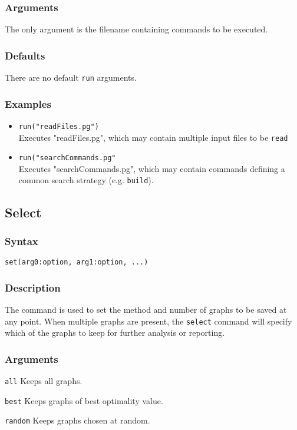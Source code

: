 \documentclass[11pt]{article}
\begin{document}
		\subsubsection{Arguments}
			The only argument is the filename containing commands to be executed.
		\subsubsection{Defaults}
			There are no default \texttt{run} arguments.  
		\subsubsection{Examples}
				\begin{itemize}
				\item{\texttt{run("readFiles.pg")}\\ Executes "readFiles.pg", which may contain multiple input files to be \texttt{read}}
				\item{\texttt{run("searchCommands.pg"}\\ Executes "searchCommands.pg", which may contain commands defining a common search strategy (e.g. \texttt{build}).}
			\end{itemize}
	
	\subsection{Select}
		\subsubsection{Syntax}
			\texttt{set(arg0:option, arg1:option, ...)}
		\subsubsection{Description}
			The command is used to set the method and number of graphs to be saved at any point.
			When multiple graphs are present, the \texttt{select} command will specify which of the graphs to
			keep for further analysis or reporting.
		\subsubsection{Arguments}
			\noindent \texttt{all} Keeps all graphs.
		
			\smallskip		
			\noindent \texttt{best} Keeps graphs of best optimality value.
			
			\smallskip		
			\noindent \texttt{random} Keeps graphs chosen at random.
			
\end{document}

